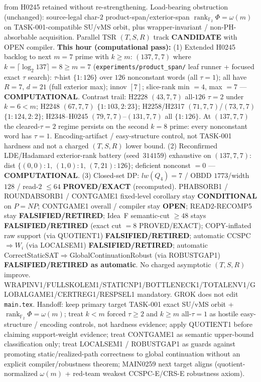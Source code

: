 \documentclass[11pt]{article}
\begin{document}
from H0245 retained without re-strengthening.
Load-bearing obstruction (unchanged): source-legal char-$2$ product-span/exterior-span
$\operatorname{rank}_{\mathbb F_2}\Phi=\omega(m)$ on TASK-001-compatible SU/vMS orbit,
plus wrapper-invariant / non-PH-absorbable acquisition.
Parallel TSR $(T,S,R)$ track \textbf{CANDIDATE} with OPEN compiler.
\textbf{This hour (computational pass):}
(1) Extended H0245 backlog to next $m{=}7$ prime with $k{\ge}m$:
$(137,7,7)$ where $k=\lceil\log_2 137\rceil=8{\ge}m{=}7$
(\texttt{experiments/product\_span/} leaf runner + focused exact $\tau$ search):
$\tau$-hist $\{1{:}126\}$ over $126$ nonconstant words (all $\tau{=}1$);
all have $R{=}7$, $d{=}21$ (full exterior max); innov $[7]$;
slice-rank min $=4$, max $=7$ --- \textbf{COMPUTATIONAL}.
Contrast trail: H2228 $(43,7,7)$ all-$126$ $\tau{=}2$ under $k{=}6{<}m$;
H2248 $(67,7,7)$ $\{1{:}103,2{:}23\}$; H2258/H2317 $(71,7,7)$/$(73,7,7)$ $\{1{:}124,2{:}2\}$;
H2348--H0245 $(79,7,7)$--$(131,7,7)$ all $\{1{:}126\}$.
At $(137,7,7)$ the cleared-$\tau{=}2$ regime persists on the second $k{=}8$ prime:
every nonconstant word has $\tau{=}1$. Encoding-artifact / easy-structure control,
not TASK-001 hardness and not a charged $(T,S,R)$ lower bound.
(2) Reconfirmed LDE/Hadamard exterior-rank battery (seed~$314159$) exhaustive on
$(137,7,7)$: dist $\{(0,0){:}1,\,(1,0){:}1,\,(7,21){:}126\}$; deficient nonconst $=0$ ---
\textbf{COMPUTATIONAL}.
(3) Closed-set DP: $lw(Q_4)=7$ / OBDD $1773$/width $128$ / read-$2$ $\le64$
\textbf{PROVED/EXACT} (recomputed).
PHABSORB1 / ROUNDABSORB1 / CONTGAME1 fixed-level corollary stay \textbf{CONDITIONAL} on $P=NP$;
CONTGAME1 overall / compiler stay \textbf{OPEN}; READ2-RECOMP5 stay \textbf{FALSIFIED/RETIRED};
Idea~F semantic-cut $\ge48$ stays \textbf{FALSIFIED/RETIRED} (exact cut $=8$ PROVED/EXACT);
COPY-inflated raw support (via QUOTIENT1) \textbf{FALSIFIED/RETIRED};
automatic CCSPC$\Rightarrow W_i$ (via LOCALSEM1) \textbf{FALSIFIED/RETIRED};
automatic CorrectStaticSAT$\Rightarrow$GlobalContinuationRobust (via ROBUSTGAP1)
\textbf{FALSIFIED/RETIRED as automatic}.
No charged asymptotic $(T,S,R)$ improve.
WRAPINV1/FULLSKOLEM1/STATICNP1/BOTTLENECK1/TOTALENV1/GLOBALGAME1/CERTREG1/RESPSEL1 mandatory.
GROK does not edit \texttt{main.tex}.
Handoff: keep primary target TASK-001 exact SU/vMS orbit + $\operatorname{rank}_{\mathbb F_2}\Phi=\omega(m)$;
treat $k{<}m$ forced $\tau{\ge}2$ and $k{\ge}m$ all-$\tau{=}1$ as hostile easy-structure /
encoding controls, not hardness evidence; apply QUOTIENT1 before claiming support-weight
evidence; treat CONTGAME1 as semantic upper-bound classification only; treat LOCALSEM1 /
ROBUSTGAP1 as guards against promoting static/realized-path correctness to global
continuation without an explicit compiler/robustness theorem; MAIN0259 next target
aligns (quotient-normalized $\omega(m)$ + red-team weakest CCSPC-E/CRS-E robustness axiom).
\end{document}
